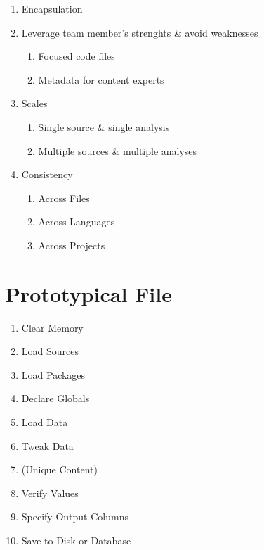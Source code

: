 \documentclass[]{book}
\providecommand{\tightlist}{%
  \setlength{\itemsep}{0pt}\setlength{\parskip}{0pt}}
\theoremstyle{definition}
\theoremstyle{definition}
\theoremstyle{definition}
\theoremstyle{remark}
\begin{document}
\begin{enumerate}
\def\labelenumi{\arabic{enumi}.}
\tightlist
\item
  Encapsulation
\item
  Leverage team member's strenghts \& avoid weaknesses

  \begin{enumerate}
  \def\labelenumii{\arabic{enumii}.}
  \tightlist
  \item
    Focused code files
  \item
    Metadata for content experts
  \end{enumerate}
\item
  Scales

  \begin{enumerate}
  \def\labelenumii{\arabic{enumii}.}
  \tightlist
  \item
    Single source \& single analysis
  \item
    Multiple sources \& multiple analyses
  \end{enumerate}
\item
  Consistency

  \begin{enumerate}
  \def\labelenumii{\arabic{enumii}.}
  \tightlist
  \item
    Across Files
  \item
    Across Languages
  \item
    Across Projects
  \end{enumerate}
\end{enumerate}

\hypertarget{prototypical-file}{%
\chapter{Prototypical File}\label{prototypical-file}}

\begin{enumerate}
\def\labelenumi{\arabic{enumi}.}
\tightlist
\item
  Clear Memory
\item
  Load Sources
\item
  Load Packages
\item
  Declare Globals
\item
  Load Data
\item
  Tweak Data
\item
  (Unique Content)
\item
  Verify Values
\item
  Specify Output Columns
\item
  Save to Disk or Database
\end{enumerate}
\end{document}
